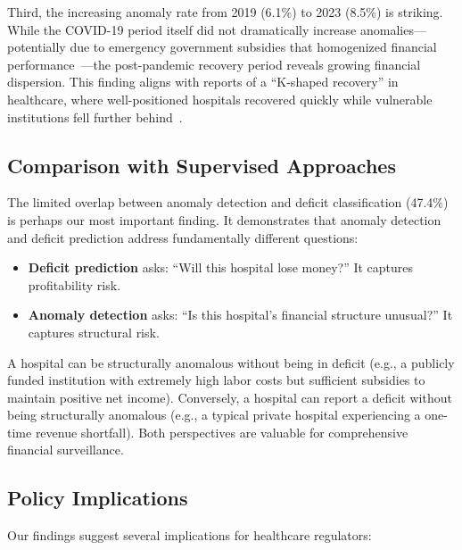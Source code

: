 \documentclass{ieeeaccess}
\begin{document}
Third, the increasing anomaly rate from 2019 (6.1\%) to 2023 (8.5\%) is striking. While the COVID-19 period itself did not dramatically increase anomalies---potentially due to emergency government subsidies that homogenized financial performance~\cite{cutler2020impact}---the post-pandemic recovery period reveals growing financial dispersion. This finding aligns with reports of a ``K-shaped recovery'' in healthcare, where well-positioned hospitals recovered quickly while vulnerable institutions fell further behind~\cite{khullar2020covid}.

\subsection{Comparison with Supervised Approaches}

The limited overlap between anomaly detection and deficit classification (47.4\%) is perhaps our most important finding. It demonstrates that anomaly detection and deficit prediction address fundamentally different questions:

\begin{itemize}
    \item \textbf{Deficit prediction} asks: ``Will this hospital lose money?'' It captures profitability risk.
    \item \textbf{Anomaly detection} asks: ``Is this hospital's financial structure unusual?'' It captures structural risk.
\end{itemize}

A hospital can be structurally anomalous without being in deficit (e.g., a publicly funded institution with extremely high labor costs but sufficient subsidies to maintain positive net income). Conversely, a hospital can report a deficit without being structurally anomalous (e.g., a typical private hospital experiencing a one-time revenue shortfall). Both perspectives are valuable for comprehensive financial surveillance.

\subsection{Policy Implications}

Our findings suggest several implications for healthcare regulators:
\end{document}
